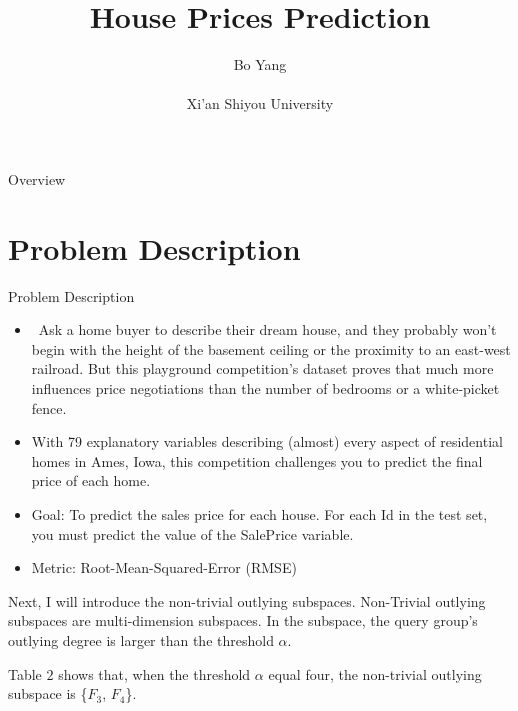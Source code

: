 \documentclass[
 size=14pt,
 paper=smartboard,  %
 mode=present, 		%
 display=slides, 	%
 style=tuliplab,  	%
 pauseslide,
 fleqn,leqno]{powerdot}
\title{House Prices Prediction}
\author{
Bo Yang
\\
\\Xi'an Shiyou University
}
\date{\gitCommitterDate}
\begin{document}
\maketitle



\begin{slide}[toc=,bm=]{Overview}
\tableofcontents[content=currentsection,type=1]
\end{slide}


\section{Problem Description}



\begin{slide}[toc=,bm=]{Problem Description}
\begin{itemize}
\item
\ Ask a home buyer to describe their dream house, and they probably won't begin with the height of the basement ceiling or the proximity to an east-west railroad. But this playground competition's dataset proves that much more influences price negotiations than the number of bedrooms or a white-picket fence.

\smallskip
\item 
With 79 explanatory variables describing (almost) every aspect of residential homes in Ames, Iowa, this competition challenges you to predict the final price of each home.

\item 
Goal: To predict the sales price for each house. For each Id in the test set, you must predict the value of the SalePrice variable. 

\item
Metric: Root-Mean-Squared-Error (RMSE)
\end{itemize}


\begin{note}
Next,
I will introduce the non-trivial outlying subspaces.
Non-Trivial outlying subspaces are multi-dimension subspaces.
In the subspace,
the query group's outlying degree is larger than the threshold $\alpha$.

Table $2$ shows that,
when the threshold $\alpha$ equal four,
the non-trivial outlying subspace is \{$F_3$, $F_4$\}.
\end{note}

\end{slide}
\end{document}
